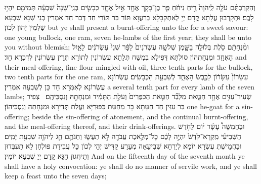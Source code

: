 {וְהִקְרַבְתֶּ֨ם עֹלָ֤ה לַֽיהֹוָה֙ רֵ֣יחַ נִיחֹ֔חַ פַּ֧ר בֶּן־בָּקָ֛ר אֶחָ֖ד אַ֣יִל אֶחָ֑ד כְּבָשִׂ֤ים בְּנֵֽי־שָׁנָה֙ שִׁבְעָ֔ה תְּמִימִ֖ם יִהְי֥וּ לָכֶֽם׃}
{וּתְקָרְבוּן עֲלָתָא קֳדָם יְיָ לְאִתְקַבָּלָא בְּרַעֲוָא תּוֹר בַּר תּוֹרֵי חַד דְּכַר חַד אִמְּרִין בְּנֵי שְׁנָא שִׁבְעָא שַׁלְמִין יְהוֹן לְכוֹן׃}
{but ye shall present a burnt-offering unto the \lord\space for a sweet savour: one young bullock, one ram, seven he-lambs of the first year; they shall be unto you without blemish;}{}
{וּמִ֨נְחָתָ֔ם סֹ֖לֶת בְּלוּלָ֣ה בַשָּׁ֑מֶן שְׁלֹשָׁ֤ה עֶשְׂרֹנִים֙ לַפָּ֔ר שְׁנֵי֙ עֶשְׂרֹנִ֔ים לָאַ֖יִל הָאֶחָֽד׃}
{וּמִנְחָתְהוֹן סוּלְתָּא דְּפִילָא בִמְשַׁח תְּלָתָא עֶשְׂרוֹנִין לְתוֹרָא תְּרֵין עֶשְׂרוֹנִין לְדִכְרָא חַד׃}
{and their meal-offering, fine flour mingled with oil, three tenth parts for the bullock, two tenth parts for the one ram,}{}
{עִשָּׂרוֹן֙ עִשָּׂר֔וֹן לַכֶּ֖בֶשׂ הָאֶחָ֑ד לְשִׁבְעַ֖ת הַכְּבָשִֽׂים׃}
{עֶשְׂרוֹנָא עֶשְׂרוֹנָא לְאִמְּרָא חַד כֵּן לְשִׁבְעָה אִמְּרִין׃}
{a several tenth part for every lamb of the seven lambs;}{}
{שְׂעִיר־עִזִּ֥ים אֶחָ֖ד חַטָּ֑את מִלְּבַ֞ד חַטַּ֤את הַכִּפֻּרִים֙ וְעֹלַ֣ת הַתָּמִ֔יד וּמִנְחָתָ֖הּ וְנִסְכֵּיהֶֽם׃ \setuma 
{}}
{צְפִיר בַּר עִזִּין חַד חַטָּתָא בָּר מֵחַטַּת כִּפּוּרַיָּא וַעֲלַת תְּדִירָא וּמִנְחָתַהּ וְנִסְכֵּיהוֹן׃}
{one he-goat for a sin-offering; beside the sin-offering of atonement, and the continual burnt-offering, and the meal-offering thereof, and their drink-offerings.}{}
{וּבַחֲמִשָּׁה֩ עָשָׂ֨ר י֜וֹם לַחֹ֣דֶשׁ הַשְּׁבִיעִ֗י מִֽקְרָא־קֹ֙דֶשׁ֙ יִהְיֶ֣ה לָכֶ֔ם כׇּל־מְלֶ֥אכֶת עֲבֹדָ֖ה לֹ֣א תַעֲשׂ֑וּ וְחַגֹּתֶ֥ם חַ֛ג לַיהֹוָ֖ה שִׁבְעַ֥ת יָמִֽים׃}
{וּבַחֲמֵישְׁתְּ עֶשְׂרָא יוֹמָא לְיַרְחָא שְׁבִיעָאָה מְעָרַע קַדִּישׁ יְהֵי לְכוֹן כָּל עֲבִידַת פּוּלְחַן לָא תַעְבְּדוּן וְתֵיחֲגוּן חַגָּא קֳדָם יְיָ שִׁבְעָא יוֹמִין׃}
{And on the fifteenth day of the seventh month ye shall have a holy convocation: ye shall do no manner of servile work, and ye shall keep a feast unto the \lord\space seven days;}{}
